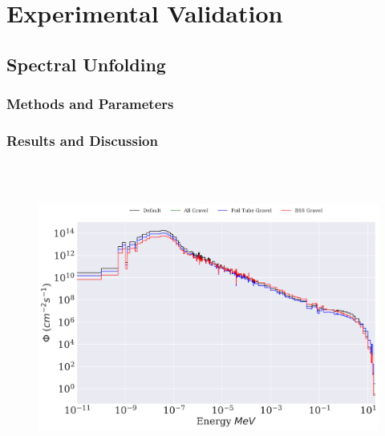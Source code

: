 
\cleardoublepage


\chapter{Experimental Validation}




\section{Spectral Unfolding}

\subsection{Methods and Parameters}


\subsection{Results and Discussion}


\begin{figure}[htb]
\includegraphics[height=4in]{tex/figures/unfolded_gr.png}
\caption[]{}
\label{fig:unfolded_gr}
\end{figure}

